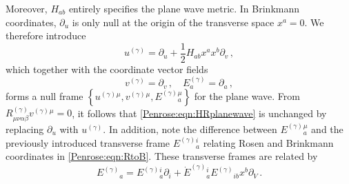 Moreover, $H_{ab}$ entirely specifies the plane wave metric. In Brinkmann coordinates, $\partial_u$ is only null at the origin of the transverse space $x^a = 0$. We therefore introduce
\begin{equation}\label{Penrose:eqn:udefplane}
u^{(\gamma)} = \partial_u + \frac{1}{2} H_{ab}x^a x^b \partial_v \, ,
\end{equation}
which together with the coordinate vector fields
\begin{equation}\label{Penrose:eqn:vdefplanewave}
v^{(\gamma)} = \partial_v \, , \quad E^{(\gamma)}_a = \partial_a \, ,
\end{equation}
forms a null frame $\left\lbrace u^{(\gamma)}{}^{\mu}, v^{(\gamma)}{}^{\mu}, E^{(\gamma)}{}^{\mu}_a \right \rbrace$
for the plane wave. From $R^{(\gamma)}_{\mu \nu \alpha \beta}v^{(\gamma)}{}^{\mu} = 0$, it follows that \eqref{Penrose:eqn:HRplanewave} is unchanged by replacing $\partial_u$ with $u^{(\gamma)}$. In addition, note the difference between $E^{(\gamma)}{}^{\mu}_a$ and the previously introduced transverse frame $E^{(\gamma)}{}^{i}_a$ relating Rosen and Brinkmann coordinates in \eqref{Penrose:eqn:RtoB}. These transverse frames are related by
\begin{equation}
E^{(\gamma)}{}_a = E^{(\gamma)}{}^i_{a}\partial_i + \dot{E}^{(\gamma)}{}^i_a E^{(\gamma)}{}_{ib} x^b 	\partial_V \, .
\end{equation}

